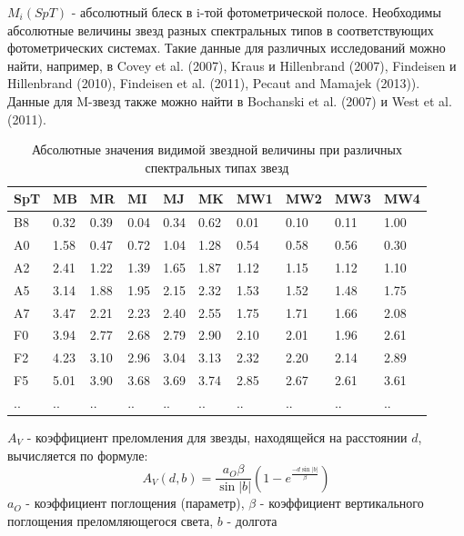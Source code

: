 \documentclass[12pt, a4paper]{article}
\begin{document}
	$M_i(SpT)$ - абсолютный блеск в i-той фотометрической полосе. Необходимы абсолютные величины звезд разных спектральных типов в соответствующих фотометрических системах. Такие данные для различных исследований можно найти, например, в Covey et al. (2007), Kraus и Hillenbrand (2007), Findeisen и Hillenbrand (2010), Findeisen et al. (2011), Pecaut and Mamajek (2013)). Данные для M-звезд также можно найти в Bochanski et al. (2007) и West et al. (2011).
	\newline
	\begin{table}
	\centering
	\small
	\setlength{\tabcolsep}{3pt}
	\begin{tabular}{|l|l|l|l|l|l|l|l|l|l|}
	\hline
	SpT & MB    & MR    & MI    & MJ    & MK    & MW1   & MW2   & MW3   & MW4   \\ \hline
	B8  & 0.32  & 0.39  & 0.04  & 0.34  & 0.62  & 0.01  & 0.10  & 0.11  & 1.00  \\ \hline
	A0  & 1.58  & 0.47  & 0.72  & 1.04  & 1.28  & 0.54  & 0.58  & 0.56  & 0.30  \\ \hline
	A2  & 2.41  & 1.22  & 1.39  & 1.65  & 1.87  & 1.12  & 1.15  & 1.12  & 1.10  \\ \hline
	A5  & 3.14  & 1.88  & 1.95  & 2.15  & 2.32  & 1.53  & 1.52  & 1.48  & 1.75  \\ \hline
	A7  & 3.47  & 2.21  & 2.23  & 2.40  & 2.55  & 1.75  & 1.71  & 1.66  & 2.08  \\ \hline
	F0  & 3.94  & 2.77  & 2.68  & 2.79  & 2.90  & 2.10  & 2.01  & 1.96  & 2.61  \\ \hline
	F2  & 4.23  & 3.10  & 2.96  & 3.04  & 3.13  & 2.32  & 2.20  & 2.14  & 2.89  \\ \hline
	F5  & 5.01  & 3.90  & 3.68  & 3.69  & 3.74  & 2.85  & 2.67  & 2.61  & 3.61  \\ \hline
	..  & ..    & ..    & ..    & ..    & ..    & ..    & ..    & ..    & ..    \\ \hline
	\end{tabular}
	\caption{Абсолютные значения видимой звездной величины при различных спектральных типах звезд}
	\end{table}
	$A_V$ - коэффициент преломления для звезды, находящейся на расстоянии $d$, вычисляется по формуле:
	$$
	A_V(d, b) = \frac{a_O \beta}{\sin |b|} \left( 1 - e^{\frac{-d \sin |b|}{\beta}}\right)
	$$
	$a_O$ - коэффициент поглощения (параметр),
	$\beta$ - коэффициент вертикального поглощения преломляющегося света,
	$b$ - долгота
\end{document}
